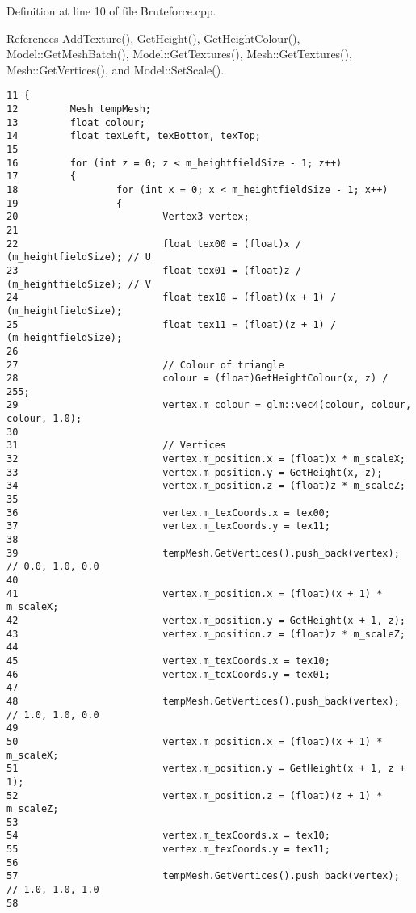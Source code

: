 Definition at line 10 of file Bruteforce.cpp.

References AddTexture(), GetHeight(), GetHeightColour(), Model::GetMeshBatch(), Model::GetTextures(), Mesh::GetTextures(), Mesh::GetVertices(), and Model::SetScale().

\begin{Code}\begin{verbatim}11 {
12         Mesh tempMesh;
13         float colour;
14         float texLeft, texBottom, texTop;
15 
16         for (int z = 0; z < m_heightfieldSize - 1; z++)
17         {
18                 for (int x = 0; x < m_heightfieldSize - 1; x++)
19                 {
20                         Vertex3 vertex;
21 
22                         float tex00 = (float)x / (m_heightfieldSize); // U
23                         float tex01 = (float)z / (m_heightfieldSize); // V
24                         float tex10 = (float)(x + 1) / (m_heightfieldSize);
25                         float tex11 = (float)(z + 1) / (m_heightfieldSize);
26 
27                         // Colour of triangle
28                         colour = (float)GetHeightColour(x, z) / 255;
29                         vertex.m_colour = glm::vec4(colour, colour, colour, 1.0);
30 
31                         // Vertices
32                         vertex.m_position.x = (float)x * m_scaleX;
33                         vertex.m_position.y = GetHeight(x, z);
34                         vertex.m_position.z = (float)z * m_scaleZ;
35 
36                         vertex.m_texCoords.x = tex00;
37                         vertex.m_texCoords.y = tex11;
38                         
39                         tempMesh.GetVertices().push_back(vertex); // 0.0, 1.0, 0.0
40 
41                         vertex.m_position.x = (float)(x + 1) * m_scaleX;
42                         vertex.m_position.y = GetHeight(x + 1, z);
43                         vertex.m_position.z = (float)z * m_scaleZ;
44 
45                         vertex.m_texCoords.x = tex10;
46                         vertex.m_texCoords.y = tex01;
47 
48                         tempMesh.GetVertices().push_back(vertex); // 1.0, 1.0, 0.0
49 
50                         vertex.m_position.x = (float)(x + 1) * m_scaleX;
51                         vertex.m_position.y = GetHeight(x + 1, z + 1);
52                         vertex.m_position.z = (float)(z + 1) * m_scaleZ;
53 
54                         vertex.m_texCoords.x = tex10;
55                         vertex.m_texCoords.y = tex11;
56 
57                         tempMesh.GetVertices().push_back(vertex); // 1.0, 1.0, 1.0
58                         

\end{verbatim}
\end{Code}
